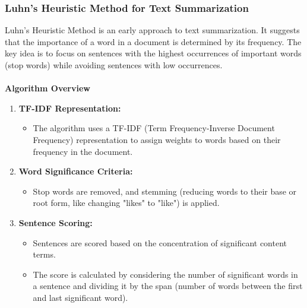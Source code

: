 \documentclass{ieeeaccess}
\begin{document}
\subsubsection{Luhn's Heuristic Method for Text Summarization}
Luhn's Heuristic Method is an early approach to text summarization. It suggests that the importance of a word in a document is determined by its frequency. The key idea is to focus on sentences with the highest occurrences of important words (stop words) while avoiding sentences with low occurrences.\cite{textsummarization}\\\\
\textbf{Algorithm Overview}\cite{luhn}
\begin{enumerate}
    \item \textbf{TF-IDF Representation:}
    \begin{itemize}
        \item The algorithm uses a TF-IDF (Term Frequency-Inverse Document Frequency) representation to assign weights to words based on their frequency in the document.
    \end{itemize}
    
    \item \textbf{Word Significance Criteria:}
    \begin{itemize}
        \item Stop words are removed, and stemming (reducing words to their base or root form, like changing "likes" to "like") is applied.
    \end{itemize}
    
    \item \textbf{Sentence Scoring:}
    \begin{itemize}
        \item Sentences are scored based on the concentration of significant content terms.
        \item The score is calculated by considering the number of significant words in a sentence and dividing it by the span (number of words between the first and last significant word).
    \end{itemize}


\end{enumerate}
\end{document}
